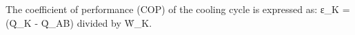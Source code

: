 The coefficient of performance (COP) of the cooling cycle is expressed as:  
ε_K = (Q̇_K - Q̇_AB) divided by Ẇ_K.